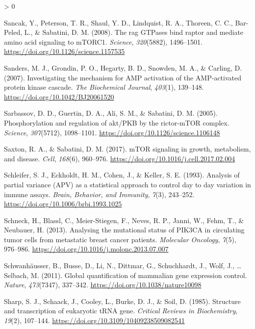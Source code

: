\documentclass[
  12pt,
  openany]{book}
\newlength{\cslhangindent}
\newenvironment{CSLReferences}[2] %
 {%
  \setlength{\parindent}{0pt}
  \ifodd #1 \everypar{\setlength{\hangindent}{\cslhangindent}}\ignorespaces\fi
  \ifnum #2 > 0
  \setlength{\parskip}{#2\baselineskip}
  \fi
 }%
 {}
\begin{document}
\begin{CSLReferences}{1}{0}
\leavevmode\hypertarget{ref-Sancak2008}{}%
Sancak, Y., Peterson, T. R., Shaul, Y. D., Lindquist, R. A., Thoreen, C. C., Bar-Peled, L., \& Sabatini, D. M. (2008). The rag {GTPases} bind raptor and mediate amino acid signaling to {mTORC}1. \emph{Science}, \emph{320}(5882), 1496--1501. \url{https://doi.org/10.1126/science.1157535}

\leavevmode\hypertarget{ref-Sanders2007}{}%
Sanders, M. J., Grondin, P. O., Hegarty, B. D., Snowden, M. A., \& Carling, D. (2007). Investigating the mechanism for {AMP} activation of the {AMP}-activated protein kinase cascade. \emph{The Biochemical Journal}, \emph{403}(1), 139--148. \url{https://doi.org/10.1042/BJ20061520}

\leavevmode\hypertarget{ref-Sarbassov2005}{}%
Sarbassov, D. D., Guertin, D. A., Ali, S. M., \& Sabatini, D. M. (2005). Phosphorylation and regulation of akt/{PKB} by the rictor-{mTOR} complex. \emph{Science}, \emph{307}(5712), 1098--1101. \url{https://doi.org/10.1126/science.1106148}

\leavevmode\hypertarget{ref-Saxton2017}{}%
Saxton, R. A., \& Sabatini, D. M. (2017). {mTOR} signaling in growth, metabolism, and disease. \emph{Cell}, \emph{168}(6), 960--976. \url{https://doi.org/10.1016/j.cell.2017.02.004}

\leavevmode\hypertarget{ref-Schleifer1993}{}%
Schleifer, S. J., Eckholdt, H. M., Cohen, J., \& Keller, S. E. (1993). Analysis of partial variance ({APV}) as a statistical approach to control day to day variation in immune assays. \emph{Brain, Behavior, and Immunity}, \emph{7}(3), 243--252. \url{https://doi.org/10.1006/brbi.1993.1025}

\leavevmode\hypertarget{ref-Schneck2013}{}%
Schneck, H., Blassl, C., Meier-Stiegen, F., Neves, R. P., Janni, W., Fehm, T., \& Neubauer, H. (2013). Analysing the mutational status of {PIK}3CA in circulating tumor cells from metastatic breast cancer patients. \emph{Molecular Oncology}, \emph{7}(5), 976--986. \url{https://doi.org/10.1016/j.molonc.2013.07.007}

\leavevmode\hypertarget{ref-Schwanhausser2011}{}%
Schwanhäusser, B., Busse, D., Li, N., Dittmar, G., Schuchhardt, J., Wolf, J., \ldots{} Selbach, M. (2011). Global quantification of mammalian gene expression control. \emph{Nature}, \emph{473}(7347), 337--342. \url{https://doi.org/10.1038/nature10098}

\leavevmode\hypertarget{ref-Sharp1985}{}%
Sharp, S. J., Schaack, J., Cooley, L., Burke, D. J., \& Soil, D. (1985). Structure and transcription of eukaryotic {tRNA} gene. \emph{Critical Reviews in Biochemistry}, \emph{19}(2), 107--144. \url{https://doi.org/10.3109/10409238509082541}


\end{CSLReferences}
\end{document}

